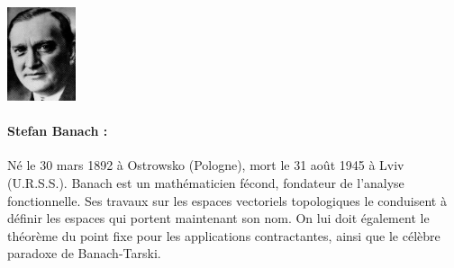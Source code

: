 \vfill
\begin{minipage}{0.2\linewidth}
\begin{center}\includegraphics[width=2cm]{images/banach.jpg}\end{center}
\end{minipage}
\begin{minipage}{0.8\linewidth}
\small{\paragraph*{Stefan Banach :} Né le 30 mars 1892 à Ostrowsko (Pologne), mort le 31 août 1945 à Lviv (U.R.S.S.). Banach est un mathématicien fécond, fondateur de l'analyse fonctionnelle. Ses travaux sur les espaces vectoriels topologiques le conduisent à définir les espaces qui portent maintenant son nom. On lui doit également le théorème du point fixe pour les applications contractantes, ainsi que le célèbre paradoxe de Banach-Tarski.}
\end{minipage}
\vfill


